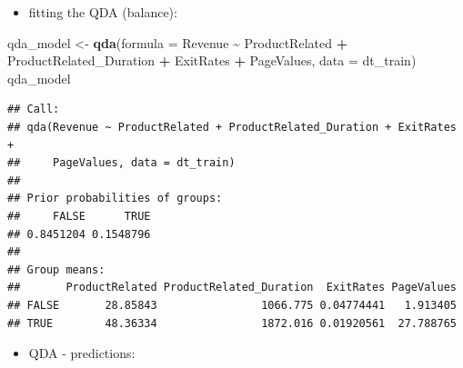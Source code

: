 \documentclass[
]{article}
\newenvironment{Shaded}{\begin{snugshade}}{\end{snugshade}}
\newcommand{\AttributeTok}[1]{\textcolor[rgb]{0.13,0.29,0.53}{#1}}
\newcommand{\FunctionTok}[1]{\textcolor[rgb]{0.13,0.29,0.53}{\textbf{#1}}}
\newcommand{\NormalTok}[1]{#1}
\newcommand{\OtherTok}[1]{\textcolor[rgb]{0.56,0.35,0.01}{#1}}
\newcommand{\SpecialCharTok}[1]{\textcolor[rgb]{0.81,0.36,0.00}{\textbf{#1}}}
\providecommand{\tightlist}{%
  \setlength{\itemsep}{0pt}\setlength{\parskip}{0pt}}
\begin{document}
\begin{itemize}
\tightlist
\item
  fitting the QDA (balance):
\end{itemize}

\begin{Shaded}
\begin{Highlighting}[]
\NormalTok{qda\_model }\OtherTok{\textless{}{-}} \FunctionTok{qda}\NormalTok{(}\AttributeTok{formula =}\NormalTok{ Revenue }\SpecialCharTok{\textasciitilde{}}\NormalTok{ ProductRelated }\SpecialCharTok{+}\NormalTok{ ProductRelated\_Duration }\SpecialCharTok{+}\NormalTok{ ExitRates }\SpecialCharTok{+}\NormalTok{ PageValues, }\AttributeTok{data =}\NormalTok{ dt\_train)}
\NormalTok{qda\_model}
\end{Highlighting}
\end{Shaded}

\begin{verbatim}
## Call:
## qda(Revenue ~ ProductRelated + ProductRelated_Duration + ExitRates + 
##     PageValues, data = dt_train)
## 
## Prior probabilities of groups:
##     FALSE      TRUE 
## 0.8451204 0.1548796 
## 
## Group means:
##       ProductRelated ProductRelated_Duration  ExitRates PageValues
## FALSE       28.85843                1066.775 0.04774441   1.913405
## TRUE        48.36334                1872.016 0.01920561  27.788765
\end{verbatim}

\begin{itemize}
\tightlist
\item
  QDA - predictions:
\end{itemize}
\end{document}
